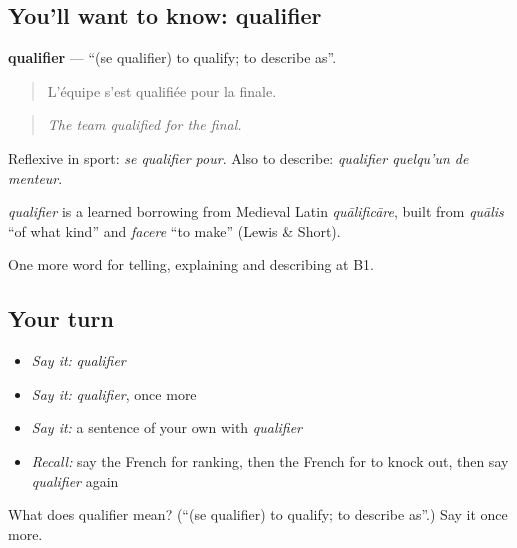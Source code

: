 \subsection*{You'll want to know: qualifier}
\textbf{qualifier} — \textquotedblleft{}(se qualifier) to qualify; to describe as\textquotedblright{}.

\begin{quote}
L'équipe s'est qualifiée pour la finale.
\end{quote}

\begin{quote}
\emph{The team qualified for the final.}
\end{quote}

Reflexive in sport: \emph{se qualifier pour}. Also to describe: \emph{qualifier quelqu'un de menteur}.

\begin{cousinweb}
\emph{qualifier} is a learned borrowing from Medieval Latin \emph{quālificāre}, built from \emph{quālis} \textquotedblleft{}of what kind\textquotedblright{} and \emph{facere} \textquotedblleft{}to make\textquotedblright{} (Lewis \& Short).
\end{cousinweb}

\begin{grammarlens}[title={What you've built}]
One more word for telling, explaining and describing at B1.
\end{grammarlens}

\subsection*{Your turn}
\begin{itemize}
\raggedright
  \item \emph{Say it:} \emph{qualifier}
  \item \emph{Say it:} \emph{qualifier}, once more
  \item \emph{Say it:} a sentence of your own with \emph{qualifier}
  \item \emph{Recall:} say the French for ranking, then the French for to knock out, then say \emph{qualifier} again
\end{itemize}

\begin{tcolorbox}[breakable,colback=teal!4,colframe=teal!35!black,title={Before you move on}]
What does qualifier mean? (\textquotedblleft{}(se qualifier) to qualify; to describe as\textquotedblright{}.) Say it once more.
\end{tcolorbox}
